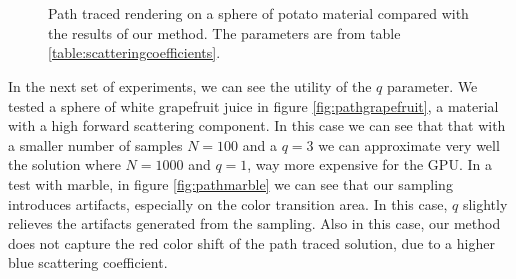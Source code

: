 \begin{figure}
{}
 \\
 \\
\caption{Path traced rendering on a sphere of potato material compared with the results of our method. The parameters are from table \ref{table:scatteringcoefficients}.}
\label{fig:pathpotato}
\end{figure}
 
In the next set of experiments, we can see the utility of the $q$ parameter. We tested a sphere of white grapefruit juice in figure \ref{fig:pathgrapefruit}, a material with a high forward scattering component. In this case we can see that that with a smaller number of samples $N = 100$ and a $q = 3$ we can approximate very well the solution where $N = 1000$ and $q = 1$, way more expensive for the GPU. In a test with marble, in figure \ref{fig:pathmarble} we can see that our sampling introduces artifacts, especially on the color transition area. In this case, $q$ slightly relieves the artifacts generated from the sampling. Also in this case, our method does not capture the red color shift of the path traced solution, due to a higher blue scattering coefficient.

